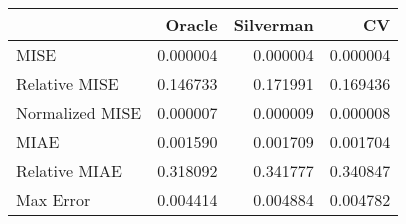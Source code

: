 \begin{tabular}{lrrr}
  \hline
 & Oracle & Silverman & CV \\ 
  \hline
MISE & 0.000004 & 0.000004 & 0.000004 \\ 
  Relative MISE & 0.146733 & 0.171991 & 0.169436 \\ 
  Normalized MISE & 0.000007 & 0.000009 & 0.000008 \\ 
  MIAE & 0.001590 & 0.001709 & 0.001704 \\ 
  Relative MIAE & 0.318092 & 0.341777 & 0.340847 \\ 
  Max Error & 0.004414 & 0.004884 & 0.004782 \\ 
   \hline
\end{tabular}
